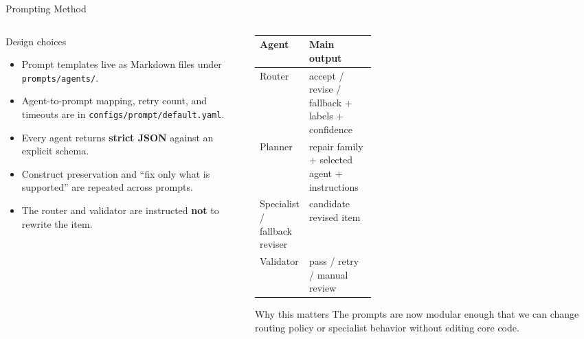 \documentclass[aspectratio=169]{beamer}
\newcommand{\slidetablefont}{\scriptsize}
\begin{document}
\begin{frame}{Prompting Method}
  \begin{columns}[T]
    \begin{column}{0.53\textwidth}
      \begin{block}{Design choices}
        \begin{itemize}
          \item Prompt templates live as Markdown files under \texttt{prompts/agents/}.
          \item Agent-to-prompt mapping, retry count, and timeouts are in \texttt{configs/prompt/default.yaml}.
          \item Every agent returns \textbf{strict JSON} against an explicit schema.
          \item Construct preservation and ``fix only what is supported'' are repeated across prompts.
          \item The router and validator are instructed \textbf{not} to rewrite the item.
        \end{itemize}
      \end{block}
    \end{column}
    \begin{column}{0.47\textwidth}
      \slidetablefont
      \begin{table}
        \centering
        \begin{tabularx}{\linewidth}{L{0.34\linewidth}Y}
          \toprule
          Agent & Main output \\
          \midrule
          Router & accept / revise / fallback + labels + confidence \\
          Planner & repair family + selected agent + instructions \\
          Specialist / fallback reviser & candidate revised item \\
          Validator & pass / retry / manual review \\
          \bottomrule
        \end{tabularx}
      \end{table}

      \vspace{0.2cm}

      \begin{alertblock}{Why this matters}
        The prompts are now modular enough that we can change routing policy or specialist behavior without editing core code.
      \end{alertblock}
    \end{column}
  \end{columns}
\end{frame}
\end{document}
